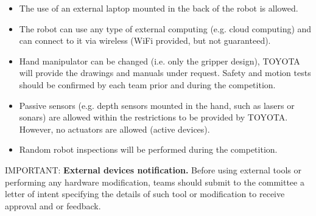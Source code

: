 \documentclass{article}
\begin{document}
\begin{itemize}
    \item The use of an external laptop mounted in the back of the robot is allowed.
    \item The robot can use any type of external computing (e.g. cloud computing) and can connect to it via wireless (WiFi provided, but not guaranteed).%
    \item Hand manipulator can be changed (i.e. only the gripper design), TOYOTA will provide the drawings and manuals under request. Safety and motion tests should be confirmed by each team prior and during the competition.
    \item Passive sensors (e.g. depth sensors mounted in the hand, such as lasers or sonars) are allowed within the restrictions to be provided by TOYOTA. However, no actuators are allowed (active devices).
    \item Random robot inspections will be performed during the competition.
\end{itemize}

IMPORTANT: \textbf{External devices notification.} Before using external tools or performing any hardware modification, teams should submit to the committee a letter of intent specifying the details of such tool or modification to receive approval and or feedback.


\end{document}
